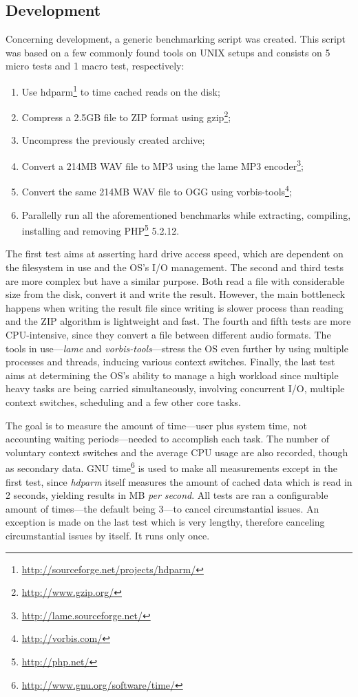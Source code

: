 \subsection{Development}
Concerning development, a generic benchmarking script was created. This script was based on a few commonly found tools on UNIX setups and consists on 5 micro tests and 1 macro test, respectively:
\begin{enumerate}
  \item Use hdparm\footnote{\url{http://sourceforge.net/projects/hdparm/}} to time cached reads on the disk;
  \item Compress a 2.5GB file to ZIP format using gzip\footnote{\url{http://www.gzip.org/}};
  \item Uncompress the previously created archive;
  \item Convert a 214MB WAV file to MP3 using the lame MP3 encoder\footnote{\url{http://lame.sourceforge.net/}};
  \item Convert the same 214MB WAV file to OGG using vorbis-tools\footnote{\url{http://vorbis.com/}};
  \item Parallelly run all the aforementioned benchmarks while extracting, compiling, installing and removing PHP\footnote{\url{http://php.net/}} 5.2.12.
\end{enumerate}
The first test aims at asserting hard drive access speed, which are dependent on the filesystem in use and the OS's I/O management. The second and third tests are more complex but have a similar purpose. Both read a file with considerable size from the disk, convert it and write the result. However, the main bottleneck happens when writing the result file since writing is slower process than reading and the ZIP algorithm is lightweight and fast. The fourth and fifth tests are more CPU-intensive, since they convert a file between different audio formats. The tools in use---\textit{lame} and \textit{vorbis-tools}---stress the OS even further by using multiple processes and threads, inducing various context switches. Finally, the last test aims at determining the OS's ability to manage a high workload since multiple heavy tasks are being carried simultaneously, involving concurrent I/O, multiple context switches, scheduling and a few other core tasks.

The goal is to measure the amount of time---user plus system time, not accounting waiting periods---needed to accomplish each task. The number of voluntary context switches and the average CPU usage are also recorded, though as secondary data. GNU time\footnote{\url{http://www.gnu.org/software/time/}} is used to make all measurements except in the first test, since \textit{hdparm} itself measures the amount of cached data which is read in 2 seconds, yielding results in MB \textit{per second}. All tests are ran a configurable amount of times---the default being 3---to cancel circumstantial issues. An exception is made on the last test which is very lengthy, therefore canceling circumstantial issues by itself. It runs only once.


